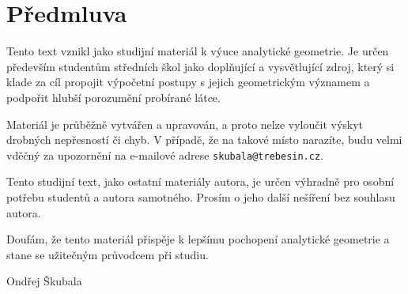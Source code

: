 \section*{Předmluva}

Tento text vznikl jako studijní materiál k výuce analytické geometrie.
Je určen především studentům středních škol jako doplňující a vysvětlující zdroj,
který si klade za cíl propojit výpočetní postupy s jejich geometrickým významem
a podpořit hlubší porozumění probírané látce.

Materiál je průběžně vytvářen a upravován, a proto nelze vyloučit výskyt
drobných nepřesností či chyb. V případě, že na takové místo narazíte,
budu velmi vděčný za upozornění na e-mailové adrese
\texttt{skubala@trebesin.cz}.

Tento studijní text, jako ostatní materiály autora, je určen výhradně pro osobní potřebu studentů a autora samotného.
Prosím o jeho další nešíření bez souhlasu autora.

Doufám, že tento materiál přispěje k lepšímu pochopení analytické geometrie
a stane se užitečným průvodcem při studiu.

\bigskip
\hfill Ondřej Škubala